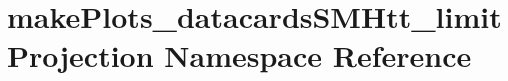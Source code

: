 \hypertarget{namespacemakePlots__datacardsSMHtt__limitProjection}{
\section{makePlots\_\-datacardsSMHtt\_\-limitProjection Namespace Reference}
\label{namespacemakePlots__datacardsSMHtt__limitProjection}
}
